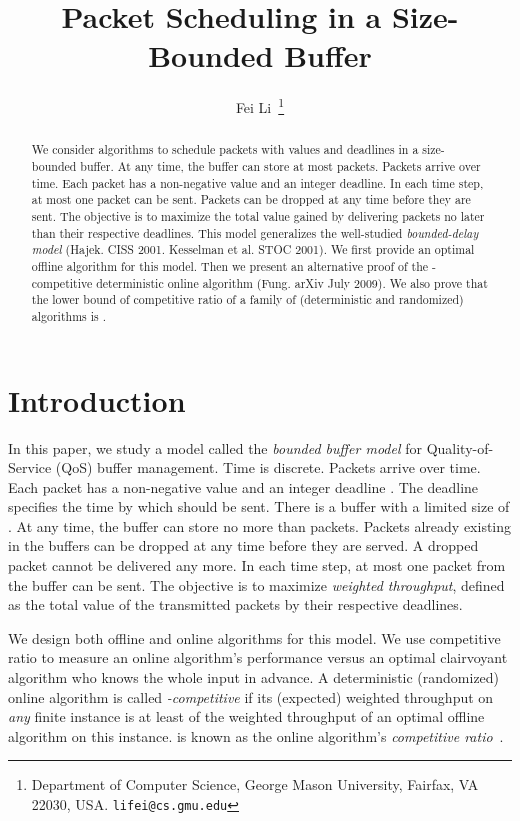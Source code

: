 \documentclass[final, 11pt]{article}
\begin{document}
\title{Packet Scheduling in a Size-Bounded Buffer}


\author{Fei Li~\thanks{Department of Computer Science, George Mason University, Fairfax, VA 22030, USA. {\tt lifei@cs.gmu.edu}}}

\maketitle



\begin{abstract}
We consider algorithms to schedule packets with values and deadlines in a size-bounded buffer. At any time, the buffer can store at most  packets. Packets arrive over time. Each packet has a non-negative value and an integer deadline. In each time step, at most one packet can be sent. Packets can be dropped at any time before they are sent. The objective is to maximize the total value gained by delivering packets no later than their respective deadlines. This model generalizes the well-studied {\em bounded-delay model} (Hajek. CISS 2001. Kesselman et al. STOC 2001). We first provide an optimal offline algorithm for this model. Then we present an alternative proof of the -competitive deterministic online algorithm (Fung. arXiv July 2009). We also prove that the lower bound of competitive ratio of a family of (deterministic and randomized) algorithms is .
\end{abstract}



\section{Introduction}

In this paper, we study a model called the {\em bounded buffer model} for Quality-of-Service (QoS) buffer management. Time is discrete. Packets arrive over time. Each packet  has a non-negative value  and an integer deadline . The deadline  specifies the time by which  should be sent. There is a buffer with a limited size of . At any time, the buffer can store no more than  packets. Packets already existing in the buffers can be dropped at any time before they are served. A dropped packet cannot be delivered any more. In each time step, at most one packet from the buffer can be sent. The objective is to maximize {\em weighted throughput}, defined as the total value of the transmitted packets by their respective deadlines.

We design both offline and online algorithms for this model.  We use competitive ratio to measure an online algorithm's performance versus an optimal clairvoyant algorithm who knows the whole input in advance. A deterministic (randomized) online algorithm is called {\em -competitive} if its (expected) weighted throughput on {\em any} finite instance is at least  of the weighted throughput of an optimal offline algorithm on this instance.  is known as the online algorithm's {\em competitive ratio}~\cite{BY98}.
\end{document}
